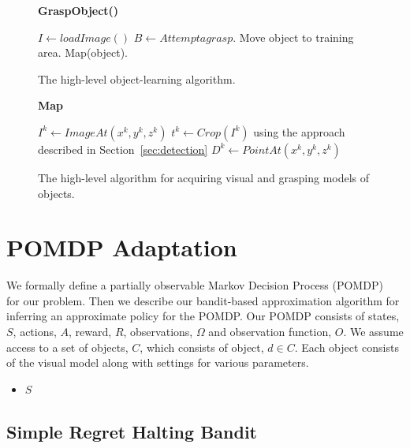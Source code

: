 \documentclass{article}
\begin{document}
\begin{figure}
  \textbf{GraspObject()}
  \begin{algorithmic}
      \STATE $I \gets loadImage()$
      \STATE $B \gets Attempt a grasp.$
        \STATE Move object to training area.
        \STATE Map(object).
      \ENDIF
    \ENDWHILE
  \end{algorithmic}
  \caption{The high-level object-learning algorithm.\label{alg:learning}}
\end{figure}


\begin{figure}
  \textbf{Map}
  \begin{algorithmic}
    \STATE $I^k \gets ImageAt (x^k, y^k, z^k)$
    \STATE $t^k \gets Crop(I^k)$ using the approach described in Section~\ref{sec:detection}
    \STATE $D^k \gets PointAt(x^k, y^k, z^k)$
    \ENDFOR
  \end{algorithmic}
  \caption{The high-level algorithm for acquiring visual and grasping
    models of objects.}
\end{figure}

\section{POMDP Adaptation}

We formally define a partially observable Markov Decision Process
(POMDP)~\citep{kaelbling98} for our problem.  Then we describe our
bandit-based approximation algorithm for inferring an approximate
policy for the POMDP.  Our POMDP consists of states, $S$, actions,
$A$, reward, $R$, observations, $\Omega$ and observation function,
$O$.  We assume access to a set of objects, $C$, which consists of
object, $d \in C$.  Each object consists of the visual model along
with settings for various parameters. 

\begin{itemize}
\item $S$ 
\end{itemize}


\subsection{Simple Regret Halting Bandit}
\end{document}
